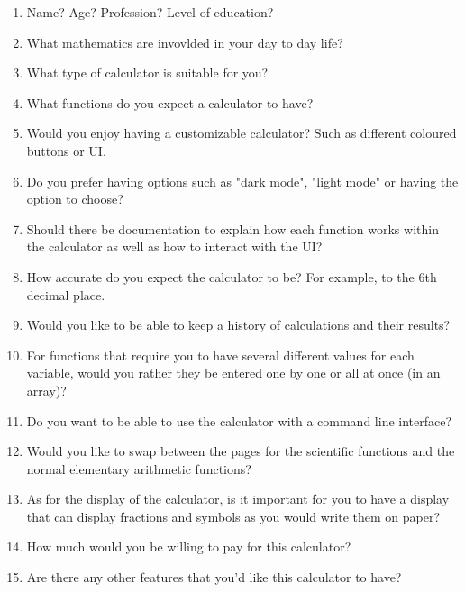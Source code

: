 \documentclass[titlepage]{article}
\begin{document}
                \begin{enumerate}
                    \item Name? Age? Profession? Level of education?
                    \item What mathematics are invovlded in your day to day life?
                    \item What type of calculator is suitable for you?
                    \item What functions do you expect a calculator to have?
                    \item Would you enjoy having a customizable calculator? Such as different coloured buttons or UI.
                    \item Do you prefer having options such as "dark mode", "light mode" or having the option to choose?
                    \item Should there be documentation to explain how each function works within the calculator as well as how to interact with the UI?
                    \item How accurate do you expect the calculator to be? For example, to the 6th decimal place.
                    \item Would you like to be able to keep a history of calculations and their results?
                    \item For functions that require you to have several different values for each variable, would you rather they be entered one by one or all at once (in an array)?
                    \item Do you want to be able to use the calculator with a command line interface?
                    \item Would you like to swap between the pages for the scientific functions and the normal elementary arithmetic functions?
                    \item As for the display of the calculator, is it important for you to have a display that can display fractions and symbols as you would write them on paper?
                    \item How much would you be willing to pay for this calculator?
                    \item Are there any other features that you'd like this calculator to have?
                \end{enumerate}
\end{document}
